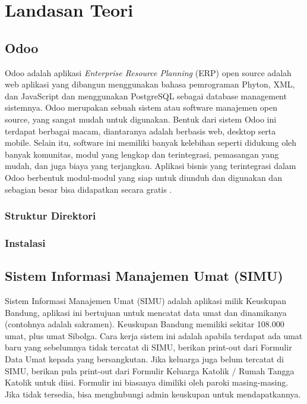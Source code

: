 \chapter{Landasan Teori}
\label{sec:landasanteori}

\section{Odoo}
\label{sec:odoo}

Odoo adalah aplikasi \textit{Enterprise Resource Planning} (ERP) open source adalah web aplikasi yang dibangun menggunakan bahasa pemrograman Phyton, XML, dan JavaScript dan menggunakan PostgreSQL sebagai database management sistemnya.  Odoo merupakan sebuah sistem atau software manajemen open source, yang sangat mudah untuk digunakan. Bentuk dari sistem Odoo ini terdapat berbagai macam, diantaranya adalah berbasis web, desktop serta mobile. Selain itu, software ini memiliki banyak kelebihan seperti didukung oleh banyak komunitas, modul yang lengkap dan terintegrasi, pemasangan yang mudah, dan juga biaya yang terjangkau. Aplikasi bisnis yang terintegrasi dalam Odoo berbentuk modul-modul yang siap untuk diunduh dan digunakan dan sebagian besar bisa didapatkan secara gratis \cite{suminten}.

\subsection{Struktur Direktori}
\label{sec:strukturDirektori}

\subsection{Instalasi}
\label{sec:instalasi}

\section{Sistem Informasi Manajemen Umat (SIMU)}
\label{sec:simu}
Sistem Informasi Manajemen Umat (SIMU) adalah aplikasi milik Keuskupan Bandung, aplikasi ini bertujuan untuk mencatat data umat dan dinamikanya (contohnya adalah sakramen). Keuskupan Bandung memiliki sekitar 108.000 umat, plus umat Sibolga. Cara kerja sistem ini adalah apabila terdapat ada umat baru yang sebelumnya tidak tercatat di SIMU, berikan print-out dari Formulir Data Umat kepada yang bersangkutan. Jika keluarga juga belum tercatat di SIMU, berikan pula print-out dari Formulir Keluarga Katolik / Rumah Tangga Katolik untuk diisi. Formulir ini biasanya dimiliki oleh paroki masing-masing. Jika tidak tersedia, bisa menghubungi admin keuskupan untuk mendapatkannya.


